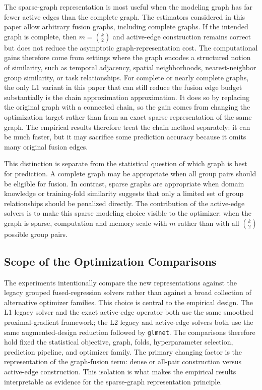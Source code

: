 \documentclass[twoside,11pt]{article}
\begin{document}
The sparse-graph representation is most useful when the modeling graph has far
fewer active edges than the complete graph. The estimators considered in this
paper allow arbitrary fusion graphs, including complete graphs. If the
intended graph is complete, then $m=\binom{k}{2}$ and active-edge construction
remains correct but does not reduce the asymptotic graph-representation cost.
The computational gains therefore come from settings where the graph encodes a
structured notion of similarity, such as temporal adjacency, spatial
neighborhoods, nearest-neighbor group similarity, or task relationships.
For complete or nearly complete graphs, the only L1 variant in this paper that
can still reduce the fusion edge budget substantially is the chain approximation
approximation. It does so by replacing the original graph with a connected
chain, so the gain comes from changing the optimization target rather than
from an exact sparse representation of the same graph. The empirical results
therefore treat the chain method separately: it can be much faster, but it may
sacrifice some prediction accuracy because it omits many original fusion
edges.

This distinction is separate from the statistical question of which graph is
best for prediction. A complete graph may be appropriate when all group pairs
should be eligible for fusion. In contrast, sparse graphs are appropriate when
domain knowledge or training-fold similarity suggests that only a limited set
of group relationships should be penalized directly. The contribution of the
active-edge solvers is to make this sparse modeling choice visible to the
optimizer: when the graph is sparse, computation and memory scale with $m$
rather than with all $\binom{k}{2}$ possible group pairs.

\subsection{Scope of the Optimization Comparisons}

The experiments intentionally compare the new representations against the
legacy grouped fused-regression solvers rather than against a broad collection
of alternative optimizer families. This choice is central to the empirical
design. The L1 legacy solver and the exact active-edge operator both use the
same smoothed proximal-gradient framework; the L2 legacy and active-edge
solvers both use the same augmented-design reduction followed by
\texttt{glmnet}. The comparisons therefore hold fixed the statistical
objective, graph, folds, hyperparameter selection, prediction pipeline, and
optimizer family. The primary changing factor is the representation of the
graph-fusion term: dense or all-pair construction versus active-edge
construction. This isolation is what makes the empirical results interpretable
as evidence for the sparse-graph representation principle.
\end{document}
